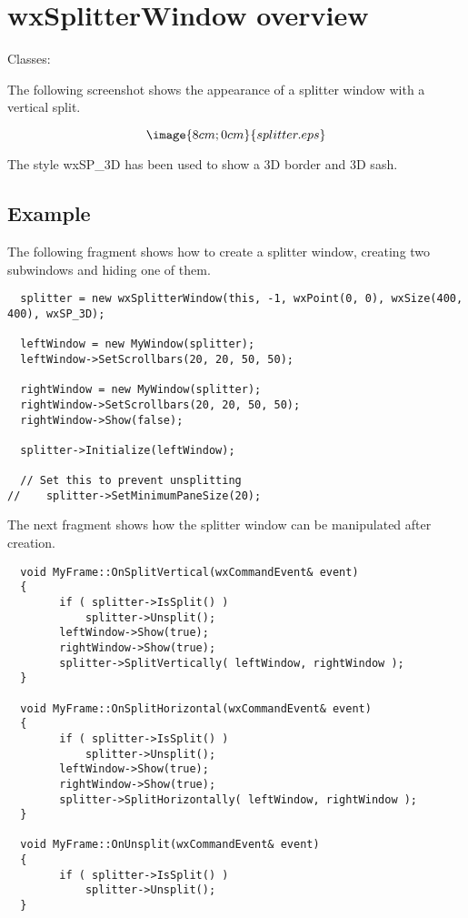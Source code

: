 \section{wxSplitterWindow overview}\label{wxsplitterwindowoverview}

Classes: 

The following screenshot shows the appearance of a splitter window with a vertical split.

$$\image{8cm;0cm}{splitter.eps}$$

The style wxSP\_3D has been used to show a 3D border and 3D sash.

\subsection{Example}

The following fragment shows how to create a splitter window, creating two
subwindows and hiding one of them.

{\small
\begin{verbatim}
  splitter = new wxSplitterWindow(this, -1, wxPoint(0, 0), wxSize(400, 400), wxSP_3D);

  leftWindow = new MyWindow(splitter);
  leftWindow->SetScrollbars(20, 20, 50, 50);

  rightWindow = new MyWindow(splitter);
  rightWindow->SetScrollbars(20, 20, 50, 50);
  rightWindow->Show(false);

  splitter->Initialize(leftWindow);

  // Set this to prevent unsplitting
//    splitter->SetMinimumPaneSize(20);
\end{verbatim}
}

The next fragment shows how the splitter window can be manipulated after creation.

{\small
\begin{verbatim}
  void MyFrame::OnSplitVertical(wxCommandEvent& event)
  {
        if ( splitter->IsSplit() )
            splitter->Unsplit();
        leftWindow->Show(true);
        rightWindow->Show(true);
        splitter->SplitVertically( leftWindow, rightWindow );
  }

  void MyFrame::OnSplitHorizontal(wxCommandEvent& event)
  {
        if ( splitter->IsSplit() )
            splitter->Unsplit();
        leftWindow->Show(true);
        rightWindow->Show(true);
        splitter->SplitHorizontally( leftWindow, rightWindow );
  }

  void MyFrame::OnUnsplit(wxCommandEvent& event)
  {
        if ( splitter->IsSplit() )
            splitter->Unsplit();
  }
\end{verbatim}
}

